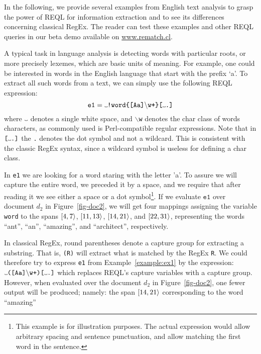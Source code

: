 In the following, we provide several examples from English text analysis to
grasp the power of REQL for information extraction and to see its differences
concerning classical RegEx. The reader can test these examples and other REQL
queries in our \rematch{} beta demo available on \url{www.rematch.cl}.
\begin{example}\label{example:ex1} A typical task in language analysis is
detecting words with particular roots, or more precisely lexemes, which are
basic units of meaning. For example, one could be interested in words in the
English language that start with the prefix `a'. To extract all such words from
a text, we can simply use the following REQL expression:
$$
\texttt{e1} = \Vtextvisiblespace \texttt{!word\{[Aa]}\backslash \texttt{w+\}[}\Vtextvisiblespace \texttt{.]}
$$
\noindent
where $\Vtextvisiblespace$ denotes a single white space, and
$\backslash$\texttt{w} denotes the char class of words characters, as commonly
used is Perl-compatible regular expressions. Note that in
$\texttt{[}\Vtextvisiblespace \texttt{.]}$ the \texttt{.} denotes the dot symbol
and not a wildcard. This is consistent with the classic RegEx syntax, since a
wildcard symbol is useless for defining a char class.

In \texttt{e1} we are looking for a word staring with the letter 'a'. To assure
we will capture the entire word, we preceded it by a space, and we require that
after reading it we see either a space or a dot symbol\footnote{This example is
for illustration purposes. The actual expression would allow arbitrary spacing
and sentence punctuation, and allow matching the first word in the sentence.}.
If we evaluate $\texttt{e1}$ over document $d_2$ in Figure~\ref{fig-doc2}, we
will get four mappings assigning the variable \texttt{word} to the spans
$[4, 7\rangle$, $[11, 13\rangle$, $[14, 21\rangle$, and $[22, 31\rangle$,
representing the words ``ant'', ``an'', ``amazing'', and ``architect'',
respectively.
\end{example}
In classical RegEx, round parentheses denote a capture group for extracting a
substring. That is,  \texttt{(R)} will extract what is matched by the RegEx
\texttt{R}. We could therefore try to express \texttt{e1} from
Example~\ref{example:ex1} by the expression: $\Vtextvisiblespace
\texttt{([Aa]}\backslash \texttt{w+)[}\Vtextvisiblespace \texttt{.]}$ which
replaces REQL's capture variables with a capture group. However, when evaluated
over the document $d_2$ in Figure~\ref{fig-doc2}, one fewer output will be
produced; namely: the span $[14, 21\rangle$ corresponding to the word ``amazing''
